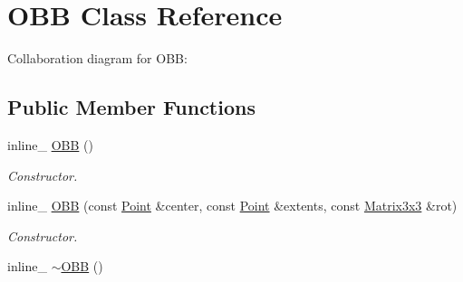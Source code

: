 \hypertarget{class_o_b_b}{\section{O\+B\+B Class Reference}
\label{class_o_b_b}
}


Collaboration diagram for O\+B\+B\+:
\subsection*{Public Member Functions}
\begin{DoxyCompactItemize}
\item 
\hypertarget{class_o_b_b_a623ea9ac0e503fc643e91105d8dd1c29}{inline\+\_\+ \hyperlink{class_o_b_b_a623ea9ac0e503fc643e91105d8dd1c29}{O\+B\+B} ()}\label{class_o_b_b_a623ea9ac0e503fc643e91105d8dd1c29}

\begin{DoxyCompactList}\small\item\em Constructor. \end{DoxyCompactList}\item 
\hypertarget{class_o_b_b_aeaefb4753bda0abd28f063d9c7ff9300}{inline\+\_\+ \hyperlink{class_o_b_b_aeaefb4753bda0abd28f063d9c7ff9300}{O\+B\+B} (const \hyperlink{class_point}{Point} \&center, const \hyperlink{class_point}{Point} \&extents, const \hyperlink{class_matrix3x3}{Matrix3x3} \&rot)}\label{class_o_b_b_aeaefb4753bda0abd28f063d9c7ff9300}

\begin{DoxyCompactList}\small\item\em Constructor. \end{DoxyCompactList}\item 
\hypertarget{class_o_b_b_af7e5c42b99c8b4376a68922c8d586b87}{inline\+\_\+ \hyperlink{class_o_b_b_af7e5c42b99c8b4376a68922c8d586b87}{$\sim$\+O\+B\+B} ()}\label{class_o_b_b_af7e5c42b99c8b4376a68922c8d586b87}


\end{DoxyCompactItemize}
